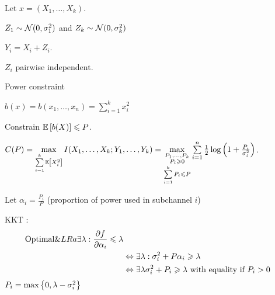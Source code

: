 Let $x = (X_1,\ldots,X_k)$.

$Z_1 \sim\mathcal{N}(0,\sigma_1^2)$ and  $Z_k \sim\mathcal{N}(0,\sigma_k^2)$

$Y_i = X_i + Z_i$.

$Z_i$ pairwise independent.

Power constraint

$b(x) = b(x_1,\ldots,x_n) = \sum\limits_{i=1}^k x_i^2$

Constrain $\mathbb{E}\left[ b(X) \right] \leqslant P$.

$C(P) = \max\limits_{\sum\limits_{i=1}^k \mathbb{E}\left[ X_i^2 \right]} I(X_1,\ldots,X_k ; Y_1,\ldots, Y_k) = \max\limits_{\substack{P_1,\ldots,P_k\\P_i \geqslant 0\\\sum\limits_{i=1}^k P_i \leqslant P}} \sum\limits_{i=1}^n\frac{1}{2} \log\left(1+\frac{P_i}{\sigma_i^2}\right)$.

Let $\alpha_i=\frac{P_i}{P}$ (proportion of power used in subchannel $i$)

KKT : 
\[
    \begin{aligned}
        \text{Optimal} \&LRa \exists \lambda: \frac{\partial f}{\partial \alpha_i} \leqslant\lambda\\
        &\Leftrightarrow \exists \lambda : \sigma_i^2+P\alpha_i \geqslant \lambda\\
        &\Leftrightarrow \exists \lambda \sigma_i^2+P_i \geqslant \lambda \text{ with equality if }P_i > 0
    \end{aligned}
\]
$P_i = \max\left\{ 0,\lambda - \sigma_i^2 \right\}$